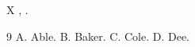 \documentclass{article}
\begin{document}
X \cite{c,a,b,d}, \cite{b,c,d}.
\begin{thebibliography}{9}
 A. Able.
 B. Baker.
 C. Cole.
 D. Dee.
\end{thebibliography}
\end{document}

